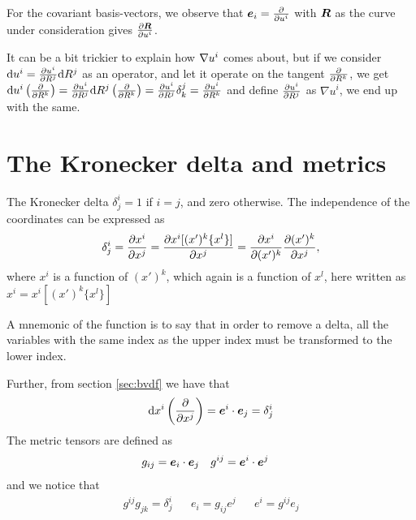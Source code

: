 \documentclass[a4paper, 12pt]{article}
\begin{document}
For the covariant basis-vectors, we observe that $\boldsymbol{e}_i = \frac{\partial {}}{\partial{u^i}}$ 
with $\boldsymbol{R}$ as the curve under consideration gives $\frac{\partial {\boldsymbol{R}}}{\partial{u^i}}$.

It can be a bit trickier to explain how $\nabla u^i$ comes about, but if we 
consider $\text{d} u^i = \frac{\partial {u^i}}{\partial{R^j}} \text{d} R^j$ as an operator, and let it operate 
on the tangent $\frac{\partial {}}{\partial{R^k}}$, we get $\text{d} u^i\left(\frac{\partial {}}{\partial{R^k}}\right) = 
\frac{\partial {u^i}}{\partial{R^j}} \text{d} R^j\left(\frac{\partial {}}{\partial{R^k}}\right) = \frac{\partial {u^i}}{\partial{R^j}} \delta^j_k = 
\frac{\partial {u^i}}{\partial{R^k}}$ and define $\frac{\partial {u^i}}{\partial{R^j}}$ as $\nabla u^i$, we end up with 
the same.





\section{The Kronecker delta and metrics}
The Kronecker delta $\delta^i_j = 1$ if $i=j$, and zero otherwise. The 
independence of the coordinates can be expressed as
%
\begin{align*}
 \delta^i_j = \frac{\partial {x^i}}{\partial{x^j}} = \frac{\partial {x^i[(x')^k\{x^l\}]}}{\partial{x^j}} = 
 \frac{\partial {x^i}}{\partial{(x')^k}}\frac{\partial {(x')^k}}{\partial{x^j}},
\end{align*}
%
where $x^i$ is a function of $(x')^k$, which again is a function of $x^l$, here 
written as $x^i = x^i[(x')^k\{x^l\}]$

A mnemonic of the function is to say that in order to remove a delta, all the 
variables with the same index as the upper index must be transformed to the 
lower index.

Further, from section \ref{sec:bvdf} we have that
%
\begin{align*}
 \text{d} x^i \left(\frac{\partial {}}{\partial{x^j}}\right) = \boldsymbol{e}^i\cdot\boldsymbol{e}_j = \delta^i_j
\end{align*}
%
The metric tensors are defined as
%
\begin{align*}
 &g_{ij} = \boldsymbol{e}_i\cdot\boldsymbol{e}_j&
 &g^{ij} = \boldsymbol{e}^i\cdot\boldsymbol{e}^j
\end{align*}
%
and we notice that
%
\begin{align*}
 &g^{ij} g_{jk} = \delta^i_j&
 &e_i = g_{ij}e^j &
 &e^i = g^{ij}e_j&
\end{align*}
\end{document}
